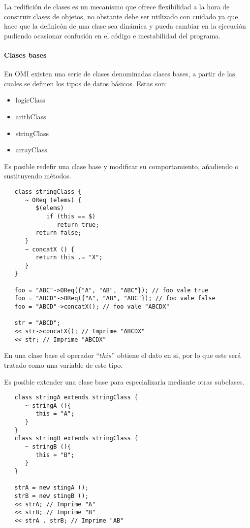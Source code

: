 La redifición de clases es un mecanismo que ofrece flexibilidad a la hora de construir clases de objetos, no obstante 
debe ser utilizado con cuidado ya que hace que la definicón de una clase sea dinámica y pueda cambiar en la ejecución 
pudiendo ocasionar confusión en el código e inestabilidad del programa.

\paragraph{Clases bases}
En OMI existen una serie de clases denominadas clases bases, a partir de las 
cuales se definen los tipos de datos básicos. Estas son:

\begin{itemize}
\item logicClass
\item arithClass
\item stringClass
\item arrayClass
\end{itemize}

Es posible redefir una clase base y modificar su comportamiento, añadiendo o sustituyendo 
métodos. \\

\begin{lstlisting}
   class stringClass {
      ~ OReq (elems) {
         $(elems)
            if (this == $) 
               return true;
         return false;
      }
      ~ concatX () {
         return this .= "X";
      }
   }

   foo = "ABC"->OReq({"A", "AB", "ABC"}); // foo vale true
   foo = "ABCD"->OReq({"A", "AB", "ABC"}); // foo vale false
   foo = "ABCD"->concatX(); // foo vale "ABCDX"
   
   str = "ABCD";
   << str->concatX(); // Imprime "ABCDX"
   << str; // Imprime "ABCDX"
\end{lstlisting}

 En una clase base el operador ``$this$'' obtiene el dato en si, por lo que este será tratado como una variable
 de este tipo.
 
 Es posible extender una clase base para especializarla mediante otras subclases. \\
 
 \begin{lstlisting}
   class stringA extends stringClass {
      ~ stringA (){
         this = "A";
      }
   }
   class stringB extends stringClass {
      ~ stringB (){
         this = "B";
      }
   }

   strA = new stingA ();
   strB = new stingB ();
   << strA; // Imprime "A"
   << strB; // Imprime "B"
   << strA . strB; // Imprime "AB"
\end{lstlisting}


